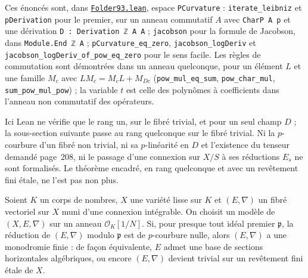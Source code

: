 {\sloppy\noindent Ces énoncés sont, dans \href{\leanblob/AlgebraicGeometry/Folder93.lean}{\texttt{Folder93.\allowbreak{}lean}}, espace \texttt{PCurvature} : \texttt{iterate\_leibniz} et \texttt{pDerivation} pour le premier, sur un anneau commutatif $A$ avec \texttt{CharP A p} et une dérivation \texttt{D : Derivation ℤ A A} ; \texttt{jacobson} pour la formule de Jacobson, dans \texttt{Module.\allowbreak{}End ℤ A} ; \texttt{pCurvature\_eq\_zero}, \texttt{jacobson\_logDeriv} et \texttt{jacobson\_logDeriv\_of\_pow\_eq\_zero} pour le sens facile. Les règles de commutation sont démontrées dans un anneau quelconque, pour un élément $L$ et une famille $M_c$ avec $L M_c = M_c L + M_{Dc}$ (\texttt{pow\_mul\_eq\_sum}, \texttt{pow\_char\_mul}, \texttt{sum\_pow\_mul\_pow}) ; la variable $t$ est celle des polynômes à coefficients dans l'anneau non commutatif des opérateurs.\par}

Ici Lean ne vérifie que le rang un, sur le fibré trivial, et pour un seul champ $D$ ; la sous-section suivante passe au rang quelconque sur le fibré trivial. Ni la $p$-courbure d'un fibré non trivial, ni sa $p$-linéarité en $D$ et l'existence du tenseur demandé page~208, ni le passage d'une connexion sur $X/S$ à ses réductions $E_s$ ne sont formalisés. Le théorème encadré, en rang quelconque et avec un revêtement fini étale, ne l'est pas non plus.

\begin{encadre}
\begin{conjecture*}
Soient $K$ un corps de nombres, $X$ une variété lisse sur $K$ et $(E, \nabla)$ un fibré vectoriel sur $X$ muni d'une connexion intégrable. On choisit un modèle de $(X, E, \nabla)$ sur un anneau $\mathcal O_K[1/N]$. Si, pour presque tout idéal premier $\mathfrak p$, la réduction de $(E, \nabla)$ modulo $\mathfrak p$ est de $p$-courbure nulle, alors $(E, \nabla)$ a une monodromie finie : de façon équivalente, $E$ admet une base de sections horizontales algébriques, ou encore $(E, \nabla)$ devient trivial sur un revêtement fini étale de $X$.
\end{conjecture*}
\end{encadre}

